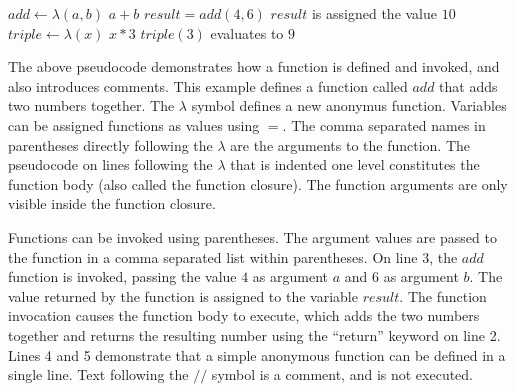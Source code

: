 \begin{codebox}
\li $add \gets \lambda(a, b)$
\Do
\li \Return $ a + b $
\End
\li $result = add(4, 6)$ \Comment $result$ is assigned the value $10$
\li $triple \gets \lambda(x)$ \Return $ x * 3 $
\li $triple(3)$ \Comment evaluates to $9$
\end{codebox}

The above pseudocode demonstrates how a function is defined and invoked, and also introduces comments. This example defines a function called $add$ that adds two numbers together. The $\lambda$ symbol defines a new anonymus function. Variables can be assigned functions as values using $=$. The comma separated names in parentheses directly following the $\lambda$ are the arguments to the function. The pseudocode on lines following the $\lambda$ that is indented one level constitutes the function body (also called the function closure). The function arguments are only visible inside the function closure.

Functions can be invoked using parentheses. The argument values are passed to the function in a comma separated list within parentheses. On line 3, the $add$ function is invoked, passing the value $4$ as argument $a$ and $6$ as argument $b$. The value returned by the function is assigned to the variable $result$. The function invocation causes the function body to execute, which adds the two numbers together and returns the resulting number using the ``return'' keyword on line 2. Lines 4 and 5 demonstrate that a simple anonymous function can be defined in a single line. Text following the $//$ symbol is a comment, and is not executed.


